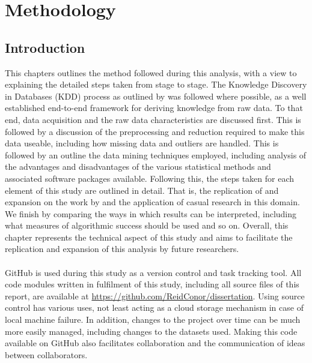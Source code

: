 %
%
%
%

\chapter{Methodology}\label{C.Methodology}
\section{Introduction}
{This chapters outlines the method followed during this analysis, with a view to explaining the detailed steps taken from stage to stage. The Knowledge Discovery in Databases (KDD) process as outlined by \cite{fayyad1996kdd} was followed where possible, as a well established end-to-end framework for deriving knowledge from raw data. To that end, data acquisition and the raw data characteristics are discussed first. This is followed by a discussion of the preprocessing and reduction required to make this data useable, including how missing data and outliers are handled. This is followed by an outline the data mining techniques employed, including analysis of the advantages and disadvantages of the various statistical methods and associated software packages available. Following this, the steps taken for each element of this study are outlined in detail. That is, the replication of and expansion on the work by \cite{moldovan2015learning} and the application of casual research in this domain. We finish by comparing the ways in which results can be interpreted, including what measures of algorithmic success should be used and so on. Overall, this chapter represents the technical aspect of this study and aims to facilitate the replication and expansion of this analysis by future researchers. \\\\
GitHub is used during this study as a version control and task tracking tool. All code modules written in fulfilment of this study, including all source files of this report, are available at \url {https://github.com/ReidConor/dissertation}. Using source control has various uses, not least acting as a cloud storage mechanism in case of local machine failure. In addition, changes to the project over time can be much more easily managed, including changes to the datasets used. Making this code available on GitHub also facilitates collaboration and the communication of ideas between collaborators.   }
